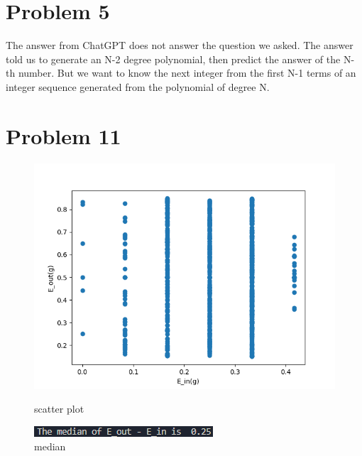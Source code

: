 \documentclass[12pt,a4paper]{article}
\begin{document}
\section*{Problem 5}
The answer from ChatGPT does not answer the question we asked.
The answer told us to generate an N-2 degree polynomial, then predict the answer of the N-th number.
But we want to know the next integer from the first N-1 terms of an integer sequence generated from the polynomial of degree N.


\newpage
\section*{Problem 11}    

\begin{figure}[hbp]
    \centering
    \begin{minipage}{0.48\linewidth}
        \centering
        \includegraphics[width = \linewidth]{Hw2P11.png}
        \caption{scatter plot}
    \end{minipage}\hfil
    \begin{minipage}{0.48\linewidth}
        \centering
        \includegraphics[width = \linewidth]{Hw2P11 median.png}
        \caption{median}
    \end{minipage}\hfil
    \centering

\end{figure}
\end{document}
